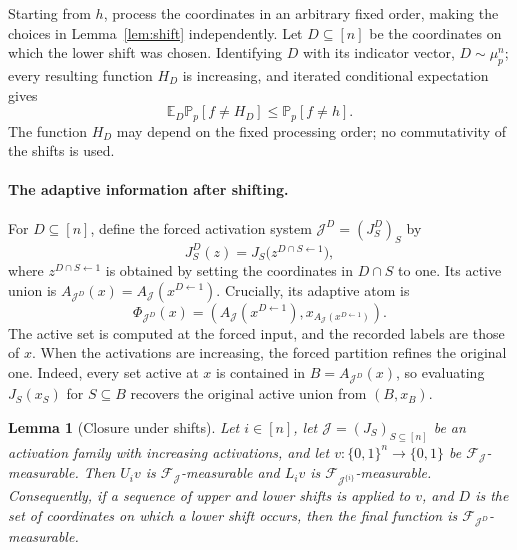 \documentclass[11pt,letterpaper]{article}
\newtheorem{lemma}[theorem]{Lemma}
\theoremstyle{definition}
\theoremstyle{remark}
\newcommand{\bits}{\{0,1\}}
\newcommand{\E}{\mathbb E}
\renewcommand{\Pr}{\mathbb P}
\newcommand{\cF}{\mathcal F}
\newcommand{\cJ}{\mathcal J}
\begin{document}
Starting from $h$, process the coordinates in an arbitrary fixed order,
making the choices in Lemma~\ref{lem:shift} independently.  Let
$D\subseteq[n]$ be the coordinates on which the lower shift was chosen.
Identifying $D$ with its indicator vector, $D\sim\mu_p^n$; every resulting
function $H_D$ is increasing, and iterated conditional expectation gives
\[
       \E_D\Pr_p[f\ne H_D]\le\Pr_p[f\ne h].
\]
The function $H_D$ may depend on the fixed processing order; no commutativity of
the shifts is used.

\paragraph{The adaptive information after shifting.}
For $D\subseteq[n]$, define the forced activation system
$\cJ^D=(J_S^D)_S$ by
\[
       J_S^D(z)=J_S\bigl(z^{D\cap S\leftarrow1}\bigr),
\]
where $z^{D\cap S\leftarrow1}$ is obtained by setting the coordinates in
$D\cap S$ to one.
Its active union is
$A_{\cJ^D}(x)=A_{\cJ}(x^{D\leftarrow1})$.  Crucially, its adaptive atom is
\[
  \Phi_{\cJ^D}(x)
  =\left(A_{\cJ}(x^{D\leftarrow1}),
          x_{A_{\cJ}(x^{D\leftarrow1})}\right).
\]
The active set is computed at the forced input, and the recorded labels are
those of $x$.  When the activations are increasing, the forced partition
refines the original one.  Indeed, every set active at $x$ is contained in
$B=A_{\cJ^D}(x)$, so evaluating $J_S(x_S)$ for $S\subseteq B$ recovers the
original active union from $(B,x_B)$.

\begin{lemma}[Closure under shifts]
\label{lem:closure}
Let $i\in[n]$, let $\cJ=(J_S)_{S\subseteq[n]}$ be an activation family with
increasing activations, and let $v:\bits^n\to\bits$ be
$\cF_{\cJ}$-measurable.  Then $U_i v$ is $\cF_{\cJ}$-measurable and $L_i v$
is $\cF_{\cJ^{\{i\}}}$-measurable.  Consequently, if a sequence of upper and
lower shifts is applied to $v$, and $D$ is the set of coordinates on which a
lower shift occurs, then the final function is $\cF_{\cJ^D}$-measurable.
\end{lemma}
\end{document}
